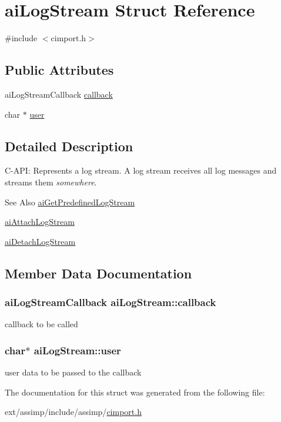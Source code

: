 \hypertarget{structai_log_stream}{\section{ai\-Log\-Stream Struct Reference}
\label{structai_log_stream}
}


{\ttfamily \#include $<$cimport.\-h$>$}

\subsection*{Public Attributes}
\begin{DoxyCompactItemize}
\item 
ai\-Log\-Stream\-Callback \hyperlink{structai_log_stream_ac73ae46eee54ba0f920d6abb97c33e97}{callback}
\item 
char $\ast$ \hyperlink{structai_log_stream_a3382042e4171a6dd5a71d7f98741f86e}{user}
\end{DoxyCompactItemize}


\subsection{Detailed Description}
C-\/\-A\-P\-I\-: Represents a log stream. A log stream receives all log messages and streams them {\itshape somewhere}. \begin{DoxySeeAlso}{See Also}
\hyperlink{cimport_8h_ad7e375d7b134ec590e812ad1f50eab94}{ai\-Get\-Predefined\-Log\-Stream} 

\hyperlink{cimport_8h_a75c5aa6027cb059e63b3dda005c9c149}{ai\-Attach\-Log\-Stream} 

\hyperlink{cimport_8h_a98ad05bb95e8f8157a97c133812a1597}{ai\-Detach\-Log\-Stream} 
\end{DoxySeeAlso}


\subsection{Member Data Documentation}
\hypertarget{structai_log_stream_ac73ae46eee54ba0f920d6abb97c33e97}{
\subsubsection[{callback}]{\setlength{\rightskip}{0pt plus 5cm}ai\-Log\-Stream\-Callback ai\-Log\-Stream\-::callback}}\label{structai_log_stream_ac73ae46eee54ba0f920d6abb97c33e97}
callback to be called \hypertarget{structai_log_stream_a3382042e4171a6dd5a71d7f98741f86e}{
\subsubsection[{user}]{\setlength{\rightskip}{0pt plus 5cm}char$\ast$ ai\-Log\-Stream\-::user}}\label{structai_log_stream_a3382042e4171a6dd5a71d7f98741f86e}
user data to be passed to the callback 

The documentation for this struct was generated from the following file\-:\begin{DoxyCompactItemize}
\item 
ext/assimp/include/assimp/\hyperlink{cimport_8h}{cimport.\-h}\end{DoxyCompactItemize}
